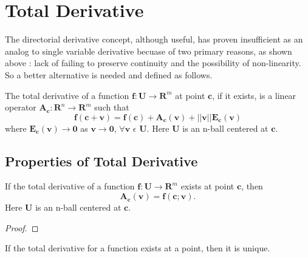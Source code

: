 \section{Total Derivative}
The directorial derivative concept, although useful, has proven insufficient as
an analog to single variable derivative becuase of two primary reasons, as shown
above : lack of failing to preserve continuity and the possibility of
non-linearity. So a better alternative is needed and defined as follows.
\begin{definition}
The total derivative of a function  $\bm{f} : \bm{U} \rightarrow \bm{R}^m$ at point
$\bm{c}$, if it exists, is a linear operator $\bm{A_{c}} : \bm{R}^n \rightarrow \bm{R}^m$ such
that
\[
\bm{f(c+v) = f(c) + A_{c}(v) + ||v||E_{c}(v)}
\]
where $\bm{E_{c}(v) \rightarrow 0}$ as $\bm{v\rightarrow 0}$, $\forall \bm{v}$
$\epsilon$ $\bm{U}$. Here $\bm{U}$ is an n-ball centered at $\bm{c}$.
\end{definition}

\subsection{Properties of Total Derivative}
\begin{theorem}
If the total derivative of a function $\bm{f} : \bm{U} \rightarrow \bm{R}^m$
exists at point $\bm{c}$, then
\[
\bm{A_{c}(v) = f(c;v)}.
\]
Here $\bm{U}$ is an n-ball centered at $\bm{c}$.
\end{theorem}
\begin{proof}
\end{proof}
\begin{lemma}
If the total derivative for a function exists at a point, then it is unique.
\end{lemma}
